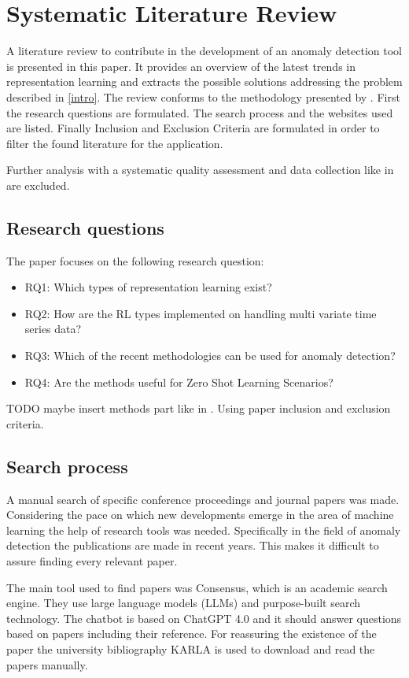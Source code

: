 \section{Systematic Literature Review}\label{methods}
A literature review to contribute in the development of an anomaly detection tool is presented in this paper. It provides an overview of the latest trends in representation learning and extracts the possible solutions addressing the problem described in \ref{intro}. The review conforms to the methodology presented by . First the research questions are formulated. The search process and the websites used are listed. Finally Inclusion and Exclusion Criteria are formulated in order to filter the found literature for the application.

Further analysis with a systematic quality assessment and data collection like in  are excluded.
\subsection{Research questions}
The paper focuses on the following research question:

\begin{itemize}
  \item RQ1: Which types of representation learning exist?
  \item RQ2: How are the RL types implemented on handling multi variate time series data?
  \item RQ3: Which of the recent methodologies can be used for anomaly detection?
  \item RQ4: Are the methods useful for Zero Shot Learning Scenarios?
\end{itemize}
TODO maybe insert methods part like in \cite{su_large_2024}. Using paper inclusion and exclusion criteria.
\subsection{Search process}
A manual search of specific conference proceedings and journal papers was made. Considering the pace on which new developments emerge in the area of machine learning the help of research tools was needed. Specifically in the field of anomaly detection the publications are made in recent years. This makes it difficult to assure finding every relevant paper.

The main tool used to find papers was Consensus, which is an academic search engine. They use large language models (LLMs) and purpose-built search technology. The chatbot is based on ChatGPT 4.0 and it should answer questions based on papers including their reference. For reassuring the existence of the paper the university bibliography KARLA is used to download and read the papers manually.

